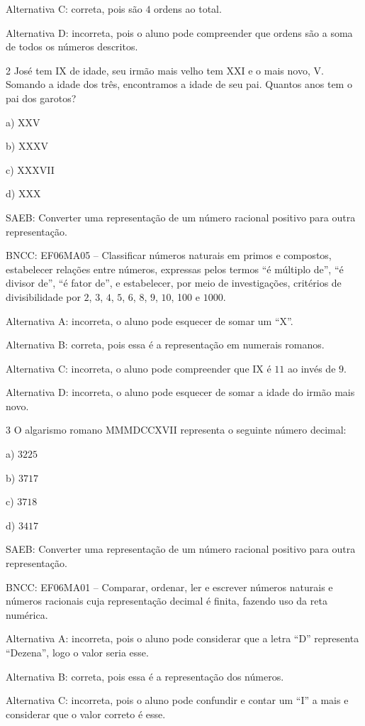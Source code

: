 Alternativa C: correta, pois são $4$ ordens ao total.

Alternativa D: incorreta, pois o aluno pode compreender que ordens são a
soma de todos os números descritos.

\num{2}  José tem IX de idade, seu irmão mais velho tem XXI e o mais novo, V.
Somando a idade dos três, encontramos a idade de seu pai. Quantos anos
tem o pai dos garotos?

a) XXV

b) XXXV

c) XXXVII

d) XXX

SAEB: Converter uma representação de um número racional positivo para
outra representação.

BNCC: EF06MA05 -- Classificar números naturais em primos e compostos,
estabelecer relações entre números, expressas pelos termos ``é múltiplo
de'', ``é divisor de'', ``é fator de'', e estabelecer, por meio de
investigações, critérios de divisibilidade por $2$, $3$, $4$, $5$, $6$, $8$, $9$, $10$,
100 e $1000$.

Alternativa A: incorreta, o aluno pode esquecer de somar um ``X''.

Alternativa B: correta, pois essa é a representação em numerais romanos.

Alternativa C: incorreta, o aluno pode compreender que IX é $11$ ao invés
de $9$.

Alternativa D: incorreta, o aluno pode esquecer de somar a idade do
irmão mais novo.

\num{3}  O algarismo romano MMMDCCXVII representa o seguinte número decimal:

a) $3225$

b) $3717$

c) $3718$

d) $3417$

SAEB: Converter uma representação de um número racional positivo para
outra representação.

BNCC: EF06MA01 -- Comparar, ordenar, ler e escrever números naturais e
números racionais cuja representação decimal é finita, fazendo uso da
reta numérica.

Alternativa A: incorreta, pois o aluno pode considerar que a letra ``D''
representa ``Dezena'', logo o valor seria esse.

Alternativa B: correta, pois essa é a representação dos números.

Alternativa C: incorreta, pois o aluno pode confundir e contar um ``I''
a mais e considerar que o valor correto é esse.

